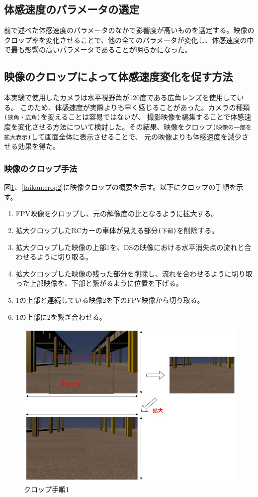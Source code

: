 \subsection{体感速度のパラメータの選定}
前で述べた体感速度のパラメータのなかで影響度が高いものを選定する。映像のクロップ率を変化させることで、他の全てのパラメータが変化し、体感速度の中で最も影響の高いパラメータであることが明らかになった。

\subsection{映像のクロップによって体感速度変化を促す方法}
本実験で使用したカメラは水平視野角が120度である広角レンズを使用している。
このため、体感速度が実際よりも早く感じることがあった。カメラの種類\verb|(狭角・広角)|を変えることは容易ではないが、
撮影映像を編集することで体感速度を変化させる方法について検討した。その結果、映像をクロップ\verb|(映像の一部を拡大表示)|して画面全体に表示させることで、
元の映像よりも体感速度を減少させる効果を得た。

\subsubsection{映像のクロップ手法}
図\ref{taikan:crop1}、\ref{taikan:crop2}に映像クロップの概要を示す。以下にクロップの手順を示す。
\begin{enumerate}
  \item FPV映像をクロップし、元の解像度の比となるように拡大する。
  \item 拡大クロップしたRCカーの車体が見える部分\verb|(下部)|を削除する。
  \item 拡大クロップした映像の上部1を、DSの映像における水平消失点の流れと合わせるように切り取る。
  \item 拡大クロップした映像の残った部分を削除し、流れを合わせるように切り取った上部映像を、下部と繋がるように位置を下げる。
  \item 1の上部と連続している映像2を下のFPV映像から切り取る。
  \item 1の上部に2を繋ぎ合わせる。
\end{enumerate}

\begin{figure}[h]
  \begin{center}
  \includegraphics[width=.8\linewidth]{img/8_1.jpg}
  \caption{クロップ手順1}
  \label{taikan:crop1}
  \end{center}
\end{figure}

